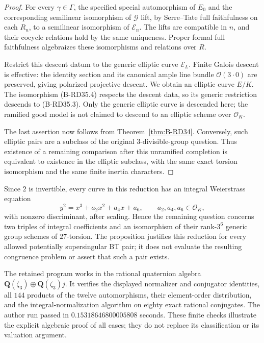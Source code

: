 \begin{proof}
For every $\gamma\in\Gamma$, the specified special automorphism
of $E_0$ and the corresponding semilinear isomorphism of
$\mathcal G$ lift, by Serre--Tate full faithfulness on each $R_n$,
to a semilinear isomorphism of $\mathcal E_n$. The lifts are
compatible in $n$, and their cocycle relations hold by the same
uniqueness. Proper formal full faithfulness algebraizes these
isomorphisms and relations over $R$.

Restrict this descent datum to the generic elliptic curve
$\mathcal E_L$. Finite Galois descent is effective: the identity
section and its canonical ample line bundle
$\mathcal O(3\cdot0)$ are preserved, giving polarized projective
descent. We obtain an elliptic curve $E/K$. The isomorphism
(B-RD35.4) respects the descent data, so its generic restriction
descends to (B-RD35.3). Only the generic elliptic curve is
descended here; the ramified good model is not claimed to descend
to an elliptic scheme over $\mathcal O_K$.

The last assertion now follows from Theorem~\ref{thm:B-RD34}.
Conversely, such elliptic pairs are a subclass of the original
$3$-divisible-group question. Thus existence of a remaining
comparison after this unramified completion is equivalent to
existence in the elliptic subclass, with the same exact torsion
isomorphism and the same finite inertia characters.
\end{proof}

\begin{remark}\label{auto:B:665ea52b93eb}

Since $2$ is invertible, every curve in this reduction has an
integral Weierstrass equation
\[
        y^2=x^3+a_2x^2+a_4x+a_6,\qquad a_2,a_4,a_6\in\mathcal O_K,
                                                        \tag{B-RD35.5}
\]
with nonzero discriminant, after scaling. Hence the remaining
question concerns two triples of integral coefficients and an
isomorphism of their rank-$3^6$ generic group schemes of
$27$-torsion. The proposition justifies this reduction for every
allowed potentially supersingular BT pair; it does not evaluate
the resulting congruence problem or assert that such a pair exists.
\end{remark}

\begin{remark}\label{auto:B:4074b39ba0d6}

The retained program 
works in the rational quaternion algebra
$\mathbf Q(\zeta_3)\oplus\mathbf Q(\zeta_3)j$.
It verifies the displayed normalizer and conjugator identities,
all $144$ products of the twelve automorphisms, their element-order
distribution, and the integral-normalization algorithm on eighty
exact rational conjugates. The author run passed in
$0.15318646800005808$ seconds. These finite checks illustrate the
explicit algebraic proof of all cases; they do not replace its
classification or its valuation argument.
\end{remark}


